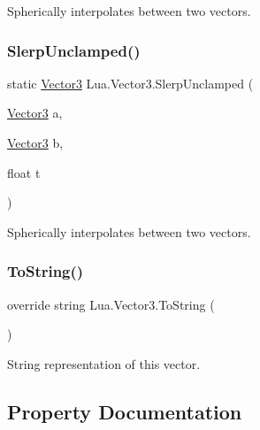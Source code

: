 Spherically interpolates between two vectors. 

\mbox{\label{class_lua_1_1_vector3_a951d3fea17d487e6c7a27d842fcaf3f7}} 
\subsubsection{\texorpdfstring{SlerpUnclamped()}{SlerpUnclamped()}}
{\footnotesize\ttfamily static \mbox{\hyperlink{class_lua_1_1_vector3}{Vector3}} Lua.\+Vector3.\+Slerp\+Unclamped (\begin{DoxyParamCaption}\item[{\mbox{\hyperlink{class_lua_1_1_vector3}{Vector3}}}]{a,  }\item[{\mbox{\hyperlink{class_lua_1_1_vector3}{Vector3}}}]{b,  }\item[{float}]{t }\end{DoxyParamCaption})\hspace{0.3cm}{\ttfamily [static]}}



Spherically interpolates between two vectors. 

\mbox{\label{class_lua_1_1_vector3_a63129be99b82f76bb94c8267b0dcd692}} 
\subsubsection{\texorpdfstring{ToString()}{ToString()}}
{\footnotesize\ttfamily override string Lua.\+Vector3.\+To\+String (\begin{DoxyParamCaption}{ }\end{DoxyParamCaption})}



String representation of this vector. 



\subsection{Property Documentation}
\mbox{\label{class_lua_1_1_vector3_a3742b113252e0163b006a17a76cb558c}} 

